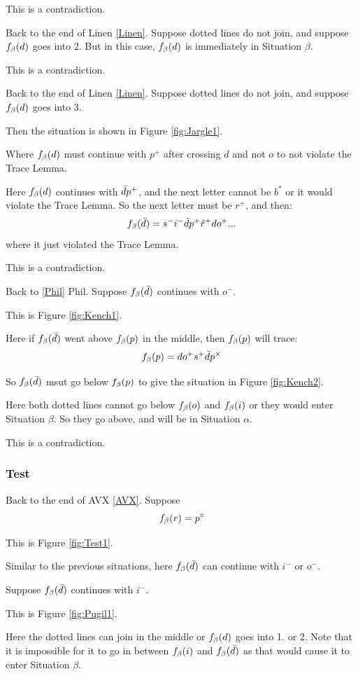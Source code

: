 This is a contradiction.


Back to the end of Linen \ref{Linen}. Suppose dotted lines do not join, and suppose $f_\beta(d)$ goes into 2. But in this case, $f_\beta(d)$ is immediately in Situation $\beta$. 

This is a contradiction.

\label{Jargle}
Back to the end of Linen \ref{Linen}. Suppose dotted lines do not join, and suppose $f_\beta(d)$ goes into 3. 

Then the situation is shown in Figure \ref{fig:Jargle1}.

Where $f_\beta(d)$ must continue with $p^+$ after crossing $d$ and not $o$ to not violate the Trace Lemma.

Here $f_\beta(d)$ continues with $\bar{d} p^+$, and the next letter cannot be $b^*$ or it would violate the Trace Lemma. So the next letter must be $r^+$, and then:
\[
f_\beta(\bar{d}) = s^- i^- \bar{d} p^+ \hat{r}^+ d o^+...
\]
where it just violated the Trace Lemma.

This is a contradiction.

\label{Kench}
Back to \ref{Phil} Phil. Suppose $f_\beta(\bar{d})$ continues with $o^-$. 

This is Figure \ref{fig:Kench1}.

Here if $f_\beta(\bar{d})$ went above $f_\beta(p)$ in the middle, then $f_\beta(p)$ will trace:
\[
f_\beta(p) = d o^+ s^+ \bar{d} p^\times
\]

So $f_\beta(\bar{d})$ msut go below $f_\beta(p)$ to give the situation in Figure \ref{fig:Kench2}.

Here both dotted lines cannot go below $f_\beta(o)$ and $f_\beta(i)$ or they would enter Situation $\beta$. So they go above, and will be in Situation $\alpha$.

This is a contradiction.


\subsubsection{Test} \label{Test}
Back to the end of AVX \ref{AVX}. Suppose 
\[
f_\beta(r) = p^\circ
\]

This is Figure \ref{fig:Test1}.

Similar to the previous situations, here $f_\beta(\bar{d})$ can continue with $i^-$ or $o^-$.

 \label{Pugil}
Suppose $f_\beta(\bar{d})$ continues with $i^-$.

This is Figure \ref{fig:Pugil1}.

Here the dotted lines can join in the middle or $f_\beta(d)$ goes into 1. or 2. Note that it is impossible for it to go in between $f_\beta(i)$ and $f_\beta(\bar{d})$ as that would cause it to enter Situation $\beta$.

